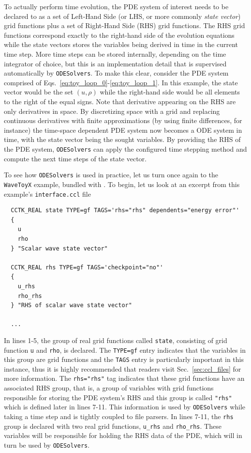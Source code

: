 To actually perform time evolution, the PDE system of interest needs to be declared to \Cactus\space as a set of Left-Hand Side (or LHS, or more commonly \textit{state vector}) grid functions plus a set of Right-Hand Side (RHS) grid functions. The RHS grid functions correspond exactly to the right-hand side of the evolution equations while the state vectors stores the variables being derived in time in the current time step. More time steps can be stored internally, depending on the time integrator of choice, but this is an implementation detail that is supervised automatically by \texttt{ODESolvers}. To make this clear, consider the PDE system comprised of Eqs.~\eqref{eq:toy_loop_0}-\eqref{eq:toy_loop_1}. In this example, the state vector would be the set $(u,\rho)$ while the right-hand side would be all elements to the right of the equal signs. Note that derivative appearing on the RHS are only derivatives in space. By discretizing space with a grid and replacing continuous derivatives with finite approximations (by using finite differences, for instance) the time-space dependent PDE system now becomes a ODE system in time, with the state vector being the sought variables. By providing the RHS of the PDE system, \texttt{ODESolvers} can apply the configured time stepping method and compute the next time steps of the state vector.

To see how \texttt{ODESolvers} is used in practice, let us turn once again to the \texttt{WaveToyX} example, bundled with \CarpetX. To begin, let us look at an excerpt from this example's \texttt{interface.ccl} file

\begin{lstlisting}
  CCTK_REAL state TYPE=gf TAGS='rhs="rhs" dependents="energy error"'
  {
    u
    rho
  } "Scalar wave state vector"

  CCTK_REAL rhs TYPE=gf TAGS='checkpoint="no"'
  {
    u_rhs
    rho_rhs
  } "RHS of scalar wave state vector"

  ...
\end{lstlisting}

In lines 1-5, the group of real grid functions called \texttt{state}, consisting of grid function \texttt{u} and \texttt{rho}, is declared. The \texttt{TYPE=gf} entry indicates that the variables in this group are grid functions and the \texttt{TAGS} entry is particularly important in this instance, thus it is highly recommended that readers visit Sec.~\ref{sec:ccl_files} for more information. The \texttt{rhs="rhs"} tag indicates that these grid functions have an associated RHS group, that is, a group of variables with grid functions responsible for storing the PDE system's RHS and this group is called \texttt{"rhs"} which is defined later in lines 7-11. This information is used by \texttt{ODESolvers} while taking a time step and is tightly coupled to \Cactus\space file parsers. In lines 7-11, the \texttt{rhs} group is declared with two real grid functions, \texttt{u\_rhs} and \texttt{rho\_rhs}. These variables will be responsible for holding the RHS data of the PDE, which will in turn be used by \texttt{ODESolvers}.

